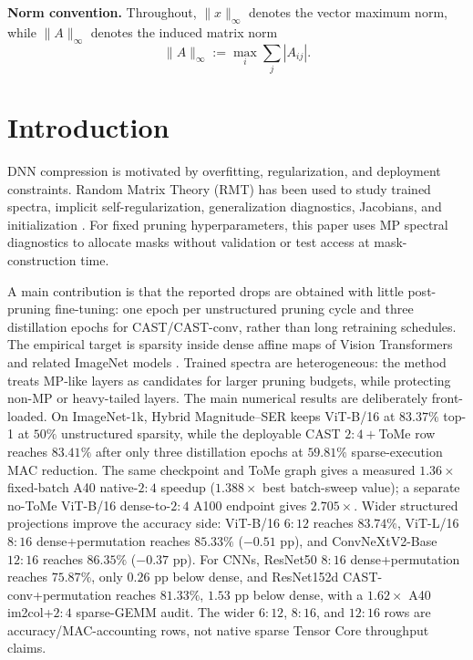 \documentclass[11pt]{article}
\theoremstyle{plain}
\theoremstyle{definition}
\theoremstyle{remark}
\newcommand{\1}{\mathbf{1}}
\begin{document}
\noindent\textbf{Norm convention.}
Throughout, \(\|x\|_\infty\) denotes the vector maximum norm, while \(\|A\|_\infty\) denotes the induced matrix norm
\[
\|A\|_\infty:=\max_i\sum_j |A_{ij}|.
\]

\tableofcontents

\section{Introduction}

DNN compression is motivated by overfitting, regularization, and deployment constraints. Random Matrix Theory (RMT) has been used to study trained spectra, implicit self-regularization, generalization diagnostics, Jacobians, and initialization \cite{martin2021implicit,mahoney2019traditional,meng2023impact,xiao2023heavy,thamm2022random,pastur2020random,pastur2023random,saada2023initialisation,martin2021predicting,martin2020heavy}. For fixed pruning hyperparameters, this paper uses MP spectral diagnostics to allocate masks without validation or test access at mask-construction time.

A main contribution is that the reported drops are obtained with little post-pruning fine-tuning: one epoch per unstructured pruning cycle and three distillation epochs for CAST/CAST-conv, rather than long retraining schedules. The empirical target is sparsity inside dense affine maps of Vision Transformers and related ImageNet models \cite{dosovitskiy2021image,vaswani2017attention}. Trained spectra are heterogeneous: the method treats MP-like layers as candidates for larger pruning budgets, while protecting non-MP or heavy-tailed layers. The main numerical results are deliberately front-loaded. On ImageNet-1k, Hybrid Magnitude--SER keeps ViT-B/16 at \(83.37\%\) top-1 at \(50\%\) unstructured sparsity, while the deployable CAST \(2{:}4{+}\)ToMe row reaches \(83.41\%\) after only three distillation epochs at \(59.81\%\) sparse-execution MAC reduction. The same checkpoint and ToMe graph gives a measured \(1.36\times\) fixed-batch A40 native-\(2{:}4\) speedup (\(1.388\times\) best batch-sweep value); a separate no-ToMe ViT-B/16 dense-to-\(2{:}4\) A100 endpoint gives \(2.705\times\). Wider structured projections improve the accuracy side: ViT-B/16 \(6{:}12\) reaches \(83.74\%\), ViT-L/16 \(8{:}16\) dense+permutation reaches \(85.33\%\) (\(-0.51\) pp), and ConvNeXtV2-Base \(12{:}16\) reaches \(86.35\%\) (\(-0.37\) pp). For CNNs, ResNet50 \(8{:}16\) dense+permutation reaches \(75.87\%\), only \(0.26\) pp below dense, and ResNet152d CAST-conv+permutation reaches \(81.33\%\), \(1.53\) pp below dense, with a \(1.62\times\) A40 im2col+\(2{:}4\) sparse-GEMM audit. The wider \(6{:}12\), \(8{:}16\), and \(12{:}16\) rows are accuracy/MAC-accounting rows, not native sparse Tensor Core throughput claims.
\end{document}
